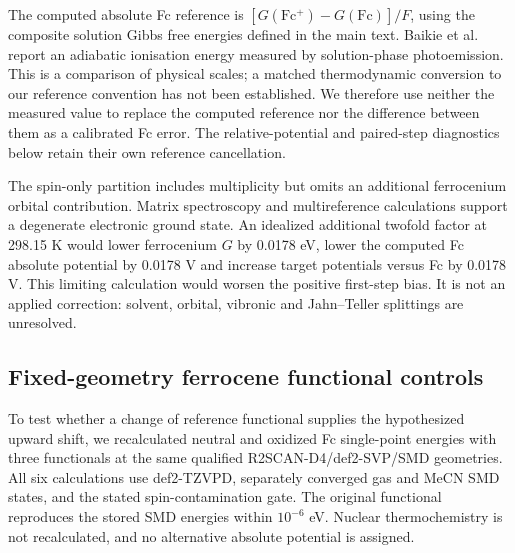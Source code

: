 \documentclass[11pt]{article}
\begin{document}
The computed absolute Fc reference is $[G(\mathrm{Fc^+})-G(\mathrm{Fc})]/F$, using the composite solution Gibbs free energies defined in the main text. Baikie et al. report an adiabatic ionisation energy measured by solution-phase photoemission.\cite{baikie2026fc} This is a comparison of physical scales; a matched thermodynamic conversion to our reference convention has not been established. We therefore use neither the measured value to replace the computed reference nor the difference between them as a calibrated Fc error. The relative-potential and paired-step diagnostics below retain their own reference cancellation.

The spin-only partition includes multiplicity but omits an additional ferrocenium orbital contribution. Matrix spectroscopy and multireference calculations support a degenerate electronic ground state.\cite{fcorbital2017} An idealized additional twofold factor at 298.15 K would lower ferrocenium $G$ by 0.0178 eV, lower the computed Fc absolute potential by 0.0178 V and increase target potentials versus Fc by 0.0178 V. This limiting calculation would worsen the positive first-step bias. It is not an applied correction: solvent, orbital, vibronic and Jahn--Teller splittings are unresolved.
\subsection{Fixed-geometry ferrocene functional controls}
To test whether a change of reference functional supplies the hypothesized upward shift, we recalculated neutral and oxidized Fc single-point energies with three functionals at the same qualified R2SCAN-D4/def2-SVP/SMD geometries. All six calculations use def2-TZVPD, separately converged gas and MeCN SMD states, and the stated spin-contamination gate. The original functional reproduces the stored SMD energies within $10^{-6}$ eV. Nuclear thermochemistry is not recalculated, and no alternative absolute potential is assigned.
\end{document}

